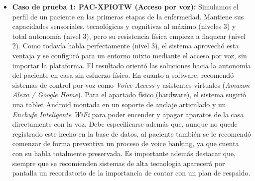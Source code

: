 \begin{itemize}
	\item \textbf{Caso de prueba 1: PAC-XPIOTW (Acceso por voz):}  Simulamos el perfil de un paciente en las primeras etapas de la enfermedad. Mantiene sus capacidades sensoriales, tecnológicas y cognitivas al máximo (niveles 3) y total autonomía (nivel 3), pero su resistencia 			física empieza a flaquear (nivel 2). Como todavía habla perfectamente (nivel 3), el sistema aprovechó esta ventaja y se configuró para un entorno mixto mediante el acceso por voz, sin importar la plataforma.
    	El resultado orientó las soluciones hacia la autonomía del paciente en casa sin esfuerzo físico. En cuanto a software, recomendó sistemas de control por voz como \textit{Voice Access} y asistentes virtuales (\textit{Amazon Alexa / Google Home}). Para el apartado físico (hardware), el 		sistema sugirió una tablet Android montada en un soporte de anclaje articulado y un \textit{Enchufe Inteligente WiFi} para poder encender y apagar aparatos de la casa directamente con la voz. 
	Debe especificarse además que, aunque no quede registrado este hecho en la base de datos, al paciente también se le recomendó comenzar de forma preventiva un proceso de voice banking, ya que cuenta con su habla totalmente preservada.
	Es importante además destacar que, siempre que se recomienden sistemas de alta tecnología aparecerá por pantalla un recordatorio de la importancia de contar con un plan de respaldo.


\end{itemize}
